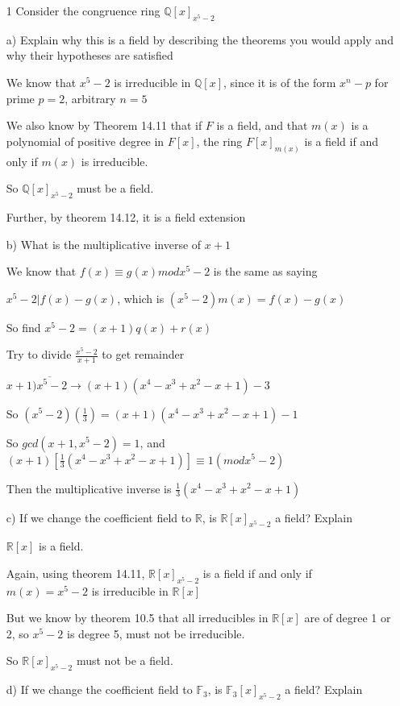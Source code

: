 \documentclass[12pt]{article}
\begin{document}
\begin{itemize}
	\item[1] Consider the congruence ring $\mathbb{Q}[x]_{x^5 -2}$

		a) Explain why this is a field by describing the theorems you would apply and why their hypotheses are satisfied

		We know that $x^5 - 2$ is irreducible in $\mathbb{Q}[x]$, since it is of the form $x^n - p$ for prime $p = 2$, arbitrary  $n = 5$

		We also know by Theorem 14.11 that if $F$ is a field, and that $m(x)$ is a polynomial of positive degree in $F[x]$, the ring $F[x]_{m(x)}$ is a field if and only if $m(x)$ is irreducible.

		So $\mathbb{Q}[x]_{x^5 - 2}$ must be a field.

		Further, by theorem 14.12, it is a field extension

		b) What is the multiplicative inverse of $x+1$

		We know that $f(x) \equiv g(x) mod x^5 - 2$ is the same as saying 

		$x^5 - 2 | f(x) - g(x)$, which is $(x^5 - 2)m(x) = f(x) -g(x)$

		So find $x^5 - 2 = (x+1)q(x) + r(x)$

		Try to divide $\frac{x^5 - 2}{x+1}$ to get remainder

		$x+1\overline{)x^5-2} \rightarrow (x+1)(x^4 - x^3 + x^2 - x + 1) - 3$

		So $(x^5-2)(\frac{1}{3}) = (x+1)(x^4 - x^3 + x^2 -x + 1) - 1$

		So $gcd(x+1, x^5 - 2) = 1$, and $(x+1)[\frac{1}{3}(x^4 - x^3 + x^2 - x + 1)] \equiv 1 (mod x^5 - 2)$

		Then the multiplicative inverse is $\frac{1}{3}(x^4 - x^3 + x^2 - x + 1)$

		c) If we change the coefficient field to $\mathbb{R}$, is $\mathbb{R}[x]_{x^5 - 2}$ a field? Explain

		$\mathbb{R}[x]$ is a field.

		Again, using theorem 14.11, $\mathbb{R}[x]_{x^5-2}$ is a field if and only if $m(x) = x^5 - 2$ is irreducible in $\mathbb{R}[x]$

		But we know by theorem 10.5 that all irreducibles in $\mathbb{R}[x]$ are of degree 1 or 2, so $x^5 -2$ is degree 5, must not be irreducible.

		So $\mathbb{R}[x]_{x^5-2}$ must not be a field.

		d) If we change the coefficient field to $\mathbb{F}_3$, is $\mathbb{F}_{3}[x]_{x^5-2}$ a field? Explain


\end{itemize}
\end{document}
